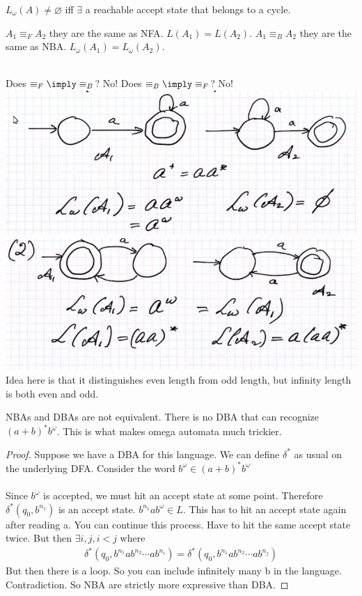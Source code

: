 \documentclass[../598comp.tex]{subfiles}
\begin{document}
\begin{lemma}
  $L_\omega(A) \neq \varnothing$ iff $\exists$ a reachable accept state that
  belongs to a cycle.
\end{lemma}
$A_1 \equiv_F A_2$ they are the same as NFA. $L(A_1) = L(A_2)$. $A_1 \equiv_B
A_2$ they are the same as NBA. $L_\omega(A_1) = L_\omega(A_2)$.
\\\\
\begin{example}
  Does $\equiv_F \imply \equiv_B$? No!
  Does $\equiv_B \imply \equiv_F$? No!
  \\
  \includegraphics[width=\textwidth]{equiv_nfa_not_nba_example.png}
  \\
  \includegraphics[width=\textwidth]{equiv_nba_not_nfa_example.png}
  Idea here is that it distinguishes even length from odd length, but infinity
  length is both even and odd.
\end{example}
\begin{theorem}
  NBAs and DBAs are not equivalent. There is no DBA that can recognize
  $(a+b)^*b^\omega$. This is what makes omega automata much trickier.
  \begin{proof}
    Suppose we have a DBA for this language. We can define $\delta^*$ as usual
    on the underlying DFA. Consider the word $b^\omega \in (a+b)^*b^\omega$
    \\\\
    Since $b^\omega$ is accepted, we must hit an accept state at some point.
    Therefore $\delta^*(q_0, b^{n_1})$ is an accept state. $b^{n_1}ab^\omega \in
    L$. This has to hit an accept state again after reading a. You can continue
    this process. Have to hit the same accept state twice. But then $\exists i,
    j, i < j$ where
    \begin{gather*}
      \delta^*(q_0, b^{n_1}ab^{n_2}\cdots ab^{n_i}) = \delta^*(q_0, b^{n_1}ab^{n_2}\cdots ab^{n_j})
    \end{gather*}
    But then there is a loop. So you can include infinitely many b in the
    language. Contradiction. So NBA are strictly more expressive than DBA.
  \end{proof}
\end{theorem}
\end{document}

